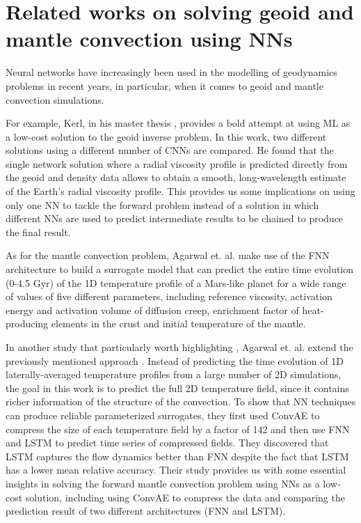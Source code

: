 \section{Related works on solving geoid and mantle convection using NNs}

Neural networks have increasingly been used in the modelling of geodynamics problems in recent years, in particular, when it comes to geoid and mantle convection simulations. 

For example, Kerl, in his master thesis \citep{kerl2022geoid}, provides a bold attempt at using ML as a low-cost solution to the geoid inverse problem. In this work, two different solutions using a different number of CNNs are compared. He found that the single network solution where a radial viscosity profile is predicted directly from the geoid and density data allows to obtain a smooth, long-wavelength estimate of the Earth's radial viscosity profile. This provides us some implications on using only one NN to tackle the forward problem instead of a solution in which different NNs are used to predict intermediate results to be chained to produce the final result.

As for the mantle convection problem, Agarwal et. al. \citep{10.1093_gji_ggaa234} make use of the FNN architecture to build a surrogate model that can predict the entire time evolution (0-4.5 Gyr) of the 1D temperature profile of a Mars-like planet for a wide range of values of five different parameters, including reference viscosity, activation energy and activation volume of diffusion creep, enrichment factor of heat-producing elements in the crust and initial temperature of the mantle.

In another study that particularly worth highlighting \citep{10.1103_physrevfluids.6.113801}, Agarwal et. al. extend the previously mentioned approach \citep{10.1093_gji_ggaa234}. Instead of predicting the time evolution of 1D laterally-averaged temperature profiles from a large number of 2D simulations, the goal in this work is to predict the full 2D temperature field, since it contains richer information of the structure of the convection.\citep{10.1103_physrevfluids.6.113801} To show that NN techniques can produce reliable parameterized surrogates, they first used ConvAE to compress the size of each temperature field by a factor of 142 and then use FNN and LSTM to predict time series of compressed fields. They discovered that LSTM captures the flow dynamics better than FNN despite the fact that LSTM has a lower mean relative accuracy. Their study provides us with some essential insights in solving the forward mantle convection problem using NNs as a low-cost solution, including using ConvAE to compress the data and comparing the prediction result of two different architectures (FNN and LSTM).

